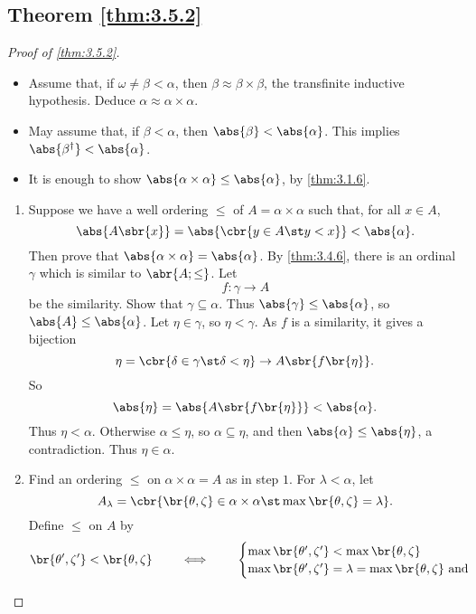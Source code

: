 \pagebreak

\subsection{Theorem \ref{thm:3.5.2}}

\begin{proof}[Proof of \ref{thm:3.5.2}]
\hfill
\begin{itemize}
\item Assume that, if $ \omega \ne \beta < \alpha $, then $ \beta \approx \beta \times \beta $, the transfinite inductive hypothesis. Deduce $ \alpha \approx \alpha \times \alpha $.
\item May assume that, if $ \beta < \alpha $, then $ \abs{\beta} < \abs{\alpha} $. This implies $ \abs{\beta^\dagger} < \abs{\alpha} $.
\item It is enough to show $ \abs{\alpha \times \alpha} \le \abs{\alpha} $, by \ref{thm:3.1.6}.
\end{itemize}
\begin{enumerate}[leftmargin=0.5in, label=Step \arabic*.]
\item Suppose we have a well ordering $ \le $ of $ A = \alpha \times \alpha $ such that, for all $ x \in A $,
$$ \abs{A\sbr{x}} = \abs{\cbr{y \in A \st y < x}} < \abs{\alpha}. $$
Then prove that $ \abs{\alpha \times \alpha} = \abs{\alpha} $. By \ref{thm:3.4.6}, there is an ordinal $ \gamma $ which is similar to $ \abr{A; \le} $. Let
$$ f : \gamma \to A $$
be the similarity. Show that $ \gamma \subseteq \alpha $. Thus $ \abs{\gamma} \le \abs{\alpha} $, so $ \abs{A} \le \abs{\alpha} $. Let $ \eta \in \gamma $, so $ \eta < \gamma $. As $ f $ is a similarity, it gives a bijection
$$ \eta = \cbr{\delta \in \gamma \st \delta < \eta} \to A\sbr{f\br{\eta}}. $$
So
$$ \abs{\eta} = \abs{A\sbr{f\br{\eta}}} < \abs{\alpha}. $$
Thus $ \eta < \alpha $. Otherwise $ \alpha \le \eta $, so $ \alpha \subseteq \eta $, and then $ \abs{\alpha} \le \abs{\eta} $, a contradiction. Thus $ \eta \in \alpha $.
\item Find an ordering $ \le $ on $ \alpha \times \alpha = A $ as in step $ 1 $. For $ \lambda < \alpha $, let
$$ A_\lambda = \cbr{\br{\theta, \zeta} \in \alpha \times \alpha \st \max\br{\theta, \zeta} = \lambda}. $$
Define $ \le $ on $ A $ by
$$ \br{\theta', \zeta'} < \br{\theta, \zeta} \qquad \iff \qquad
\begin{cases}
\max\br{\theta', \zeta'} < \max\br{\theta, \zeta} \\
\max\br{\theta', \zeta'} = \lambda = \max\br{\theta, \zeta} \ \text{and}

\end{cases}$$
\end{enumerate}
\end{proof}
